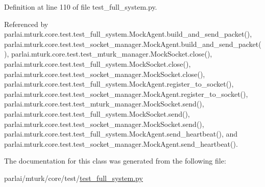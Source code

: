 Definition at line 110 of file test\+\_\+full\+\_\+system.\+py.



Referenced by parlai.\+mturk.\+core.\+test.\+test\+\_\+full\+\_\+system.\+Mock\+Agent.\+build\+\_\+and\+\_\+send\+\_\+packet(), parlai.\+mturk.\+core.\+test.\+test\+\_\+socket\+\_\+manager.\+Mock\+Agent.\+build\+\_\+and\+\_\+send\+\_\+packet(), parlai.\+mturk.\+core.\+test.\+test\+\_\+mturk\+\_\+manager.\+Mock\+Socket.\+close(), parlai.\+mturk.\+core.\+test.\+test\+\_\+full\+\_\+system.\+Mock\+Socket.\+close(), parlai.\+mturk.\+core.\+test.\+test\+\_\+socket\+\_\+manager.\+Mock\+Socket.\+close(), parlai.\+mturk.\+core.\+test.\+test\+\_\+full\+\_\+system.\+Mock\+Agent.\+register\+\_\+to\+\_\+socket(), parlai.\+mturk.\+core.\+test.\+test\+\_\+socket\+\_\+manager.\+Mock\+Agent.\+register\+\_\+to\+\_\+socket(), parlai.\+mturk.\+core.\+test.\+test\+\_\+mturk\+\_\+manager.\+Mock\+Socket.\+send(), parlai.\+mturk.\+core.\+test.\+test\+\_\+full\+\_\+system.\+Mock\+Socket.\+send(), parlai.\+mturk.\+core.\+test.\+test\+\_\+socket\+\_\+manager.\+Mock\+Socket.\+send(), parlai.\+mturk.\+core.\+test.\+test\+\_\+full\+\_\+system.\+Mock\+Agent.\+send\+\_\+heartbeat(), and parlai.\+mturk.\+core.\+test.\+test\+\_\+socket\+\_\+manager.\+Mock\+Agent.\+send\+\_\+heartbeat().



The documentation for this class was generated from the following file\+:\begin{DoxyCompactItemize}
\item 
parlai/mturk/core/test/\hyperlink{test_2test__full__system_8py}{test\+\_\+full\+\_\+system.\+py}\end{DoxyCompactItemize}
